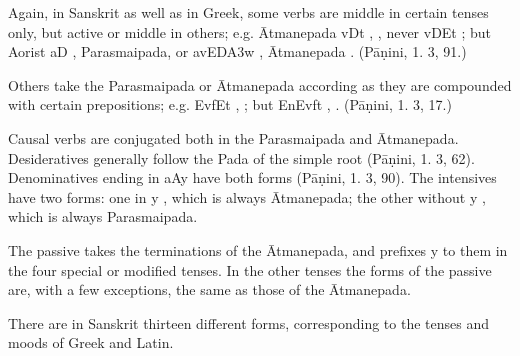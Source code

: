 \begin{note}
  Again, in Sanskrit as well as in Greek, some verbs are middle in
  certain tenses only, but active or middle in others; e.g. Ātmanepada
  {\dn vD\0t\?} , , never {\dn vD\0Et}
  ; but Aorist {\dn aD} , Parasmaipada, or
  {\dn avED\0\3A3w} , Ātmanepada . (Pāṇini, 1.
  3, 91.)

  Others take the Parasmaipada or Ātmanepada according as they are
  compounded with certain prepositions; e.g. {\dn EvfEt} ,
  ; but {\dn EnEvft\?} , .
  (Pāṇini, 1. 3, 17.)
\end{note}

\s Causal verbs are conjugated both in the Parasmaipada and Ātmanepada.
Desideratives generally follow the Pada of the simple root (Pāṇini, 1.
3, 62). Denominatives ending in {\dn aAy}  have both forms (Pāṇini,
1. 3, 90). The intensives have two forms: one in {\dn y} , which is
always Ātmanepada; the other without {\dn y} , which is always
Parasmaipada.

\s The passive takes the terminations of the Ātmanepada, and prefixes
{\dn y}  to them in the four special or modified tenses. In the
other tenses the forms of the passive are, with a few exceptions, the
same as those of the Ātmanepada.

\s There are in Sanskrit thirteen different forms, corresponding to the
tenses and moods of Greek and Latin.

